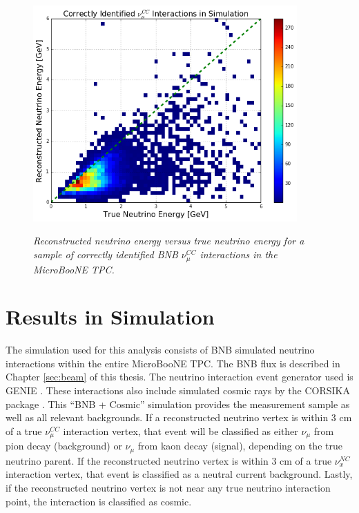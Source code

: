 \begin{figure}[ht!]
\centering
	\includegraphics[width=0.9\textwidth]{Figures/kaon_recoenergy_2d.png} \\
\caption{\textit{Reconstructed neutrino energy versus true neutrino energy for a sample of correctly identified BNB $\nu_\mu^{CC}$ interactions in the MicroBooNE TPC.}}\label{kaon_recoenergy_2d_fig}
\end{figure}

\section{Results in Simulation}
The simulation used for this analysis consists of BNB simulated neutrino interactions within the entire MicroBooNE TPC. The BNB flux is described in Chapter \ref{sec:beam} of this thesis. The neutrino interaction event generator used is GENIE \cite{GENIEsource}. These interactions also include simulated cosmic rays by the CORSIKA package \cite{CORSIKAsource}. This ``BNB + Cosmic'' simulation provides the measurement sample as well as all relevant backgrounds. If a reconstructed neutrino vertex is within 3 cm of a true $\nu_\mu^{CC}$ interaction vertex, that event will be classified as either $\nu_\mu$ from pion decay (background) or $\nu_\mu$ from kaon decay (signal), depending on the true neutrino parent. If the reconstructed neutrino vertex is within 3 cm of a true $\nu_x^{NC}$ interaction vertex, that event is classified as a neutral current background. Lastly, if the reconstructed neutrino vertex is not near any true neutrino interaction point, the interaction is classified as cosmic.\\

